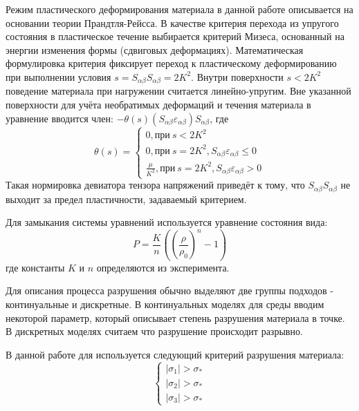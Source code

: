 Режим пластического деформирования материала в данной работе описывается на основании теории Прандтля-Рейсса.
В качестве критерия перехода из упругого состояния в пластическое течение выбирается критерий Мизеса, основанный
на энергии изменения формы (сдвиговых деформациях).
Математическая формулировка критерия фиксирует переход к пластическому деформированию при выполнении условия
$s = S_{\alpha \beta} S_{\alpha \beta} = 2 K^2$.
Внутри поверхности $s < 2 K^2$ поведение материала при нагружении считается линейно-упругим.
Вне указанной поверхности для учёта необратимых деформаций и течения материала в уравнение вводится член:
$-\theta(s)(S_{\alpha \beta}\varepsilon_{\alpha \beta})S_{\alpha \beta}$, где
\begin{equation}
    \theta(s) =
    \begin{cases}
        0, при~s < 2 K^2 \\
        0, при~s = 2 K^2, S_{\alpha \beta} \varepsilon_{\alpha \beta} \leq 0 \\
        \frac{\mu}{K^2}, при~s = 2 K^2, S_{\alpha \beta} \varepsilon_{\alpha \beta} > 0
    \end{cases}
\end{equation}
Такая нормировка девиатора тензора напряжений приведёт к тому, что $S_{\alpha \beta} S_{\alpha \beta}$ не выходит за
предел пластичности, задаваемый критерием.

Для замыкания системы уравнений используется уравнение состояния вида:
\begin{equation}
    P = \frac{K}{n} \left( \left( \frac{\rho}{\rho_0} \right)^n - 1 \right)
\end{equation}
где константы $K$ и $n$ определяются из эксперимента.

Для описания процесса разрушения обычно выделяют две группы подходов - континуальные и дискретные.
В континуальных моделях для среды вводим некоторой параметр, который описывает степень разрушения материала в точке.
В дискретных моделях считаем что разрушение происходит разрывно.

В данной работе для используется следующий критерий разрушения материала:
\begin{equation}
    \begin{cases}
        |\sigma_1| > \sigma_{*} \\
        |\sigma_2| > \sigma_{*} \\
        |\sigma_3| > \sigma_{*}
    \end{cases}
\end{equation}

